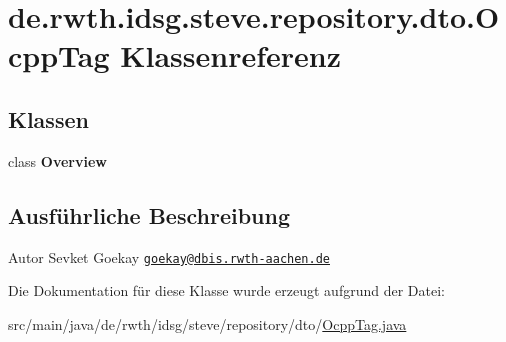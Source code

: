 \hypertarget{classde_1_1rwth_1_1idsg_1_1steve_1_1repository_1_1dto_1_1_ocpp_tag}{\section{de.\-rwth.\-idsg.\-steve.\-repository.\-dto.\-Ocpp\-Tag Klassenreferenz}
\label{classde_1_1rwth_1_1idsg_1_1steve_1_1repository_1_1dto_1_1_ocpp_tag}
}
\subsection*{Klassen}
\begin{DoxyCompactItemize}
\item 
class {\bfseries Overview}
\end{DoxyCompactItemize}


\subsection{Ausführliche Beschreibung}
\begin{DoxyAuthor}{Autor}
Sevket Goekay \href{mailto:goekay@dbis.rwth-aachen.de}{\tt goekay@dbis.\-rwth-\/aachen.\-de} 
\end{DoxyAuthor}


Die Dokumentation für diese Klasse wurde erzeugt aufgrund der Datei\-:\begin{DoxyCompactItemize}
\item 
src/main/java/de/rwth/idsg/steve/repository/dto/\hyperlink{_ocpp_tag_8java}{Ocpp\-Tag.\-java}\end{DoxyCompactItemize}
